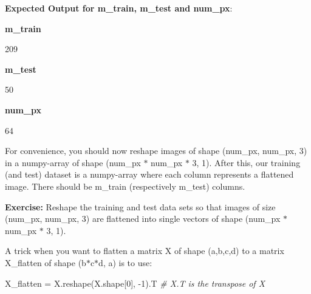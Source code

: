 \documentclass[11pt]{article}
\newenvironment{Shaded}{}{}
\newcommand{\DecValTok}[1]{\textcolor[rgb]{0.25,0.63,0.44}{{#1}}}
\newcommand{\CommentTok}[1]{\textcolor[rgb]{0.38,0.63,0.69}{\textit{{#1}}}}
\newcommand{\NormalTok}[1]{{#1}}
\newcommand{\OperatorTok}[1]{\textcolor[rgb]{0.40,0.40,0.40}{{#1}}}
\begin{document}
    \textbf{Expected Output for m\_train, m\_test and num\_px}:

\textbf{m\_train}

209

\textbf{m\_test}

50

\textbf{num\_px}

64

    For convenience, you should now reshape images of shape (num\_px,
num\_px, 3) in a numpy-array of shape (num\_px \(*\) num\_px \(*\) 3,
1). After this, our training (and test) dataset is a numpy-array where
each column represents a flattened image. There should be m\_train
(respectively m\_test) columns.

\textbf{Exercise:} Reshape the training and test data sets so that
images of size (num\_px, num\_px, 3) are flattened into single vectors
of shape (num\_px \(*\) num\_px \(*\) 3, 1).

A trick when you want to flatten a matrix X of shape (a,b,c,d) to a
matrix X\_flatten of shape (b\(*\)c\(*\)d, a) is to use:

\begin{Shaded}
\begin{Highlighting}[]
\NormalTok{X_flatten }\OperatorTok{=}\NormalTok{ X.reshape(X.shape[}\DecValTok{0}\NormalTok{], }\DecValTok{-1}\NormalTok{).T      }\CommentTok{# X.T is the transpose of X}
\end{Highlighting}
\end{Shaded}
\end{document}
